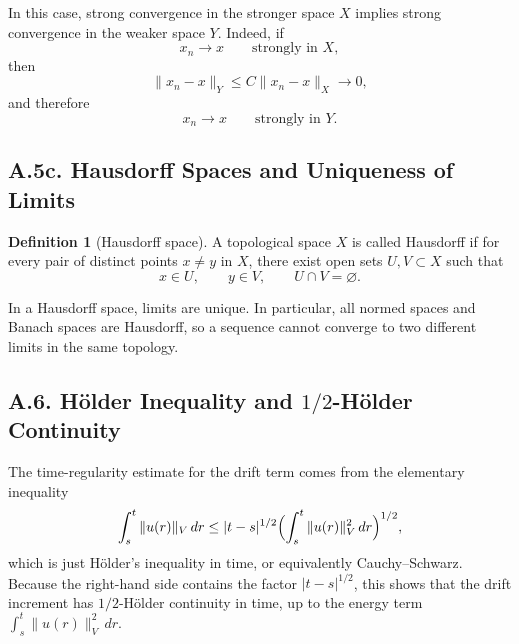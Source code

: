 \documentclass[11pt]{article}
\theoremstyle{definition}
\newtheorem{definition}{Definition}
\theoremstyle{remark}
\begin{document}
In this case, strong convergence in the stronger space $X$ implies strong convergence in the weaker space $Y$. Indeed, if
\[
  x_n\to x
  \qquad \text{strongly in } X,
\]
then
\[
  \|x_n-x\|_Y
  \le
  C\|x_n-x\|_X\to 0,
\]
and therefore
\[
  x_n\to x
  \qquad \text{strongly in } Y.
\]

\subsection*{A.5c. Hausdorff Spaces and Uniqueness of Limits}
\begin{definition}[Hausdorff space]
A topological space $X$ is called Hausdorff if for every pair of distinct points $x\neq y$ in $X$, there exist open sets $U,V\subset X$ such that
\[
  x\in U,\qquad y\in V,\qquad U\cap V=\varnothing.
\]
\end{definition}

In a Hausdorff space, limits are unique. In particular, all normed spaces and Banach spaces are Hausdorff, so a sequence cannot converge to two different limits in the same topology.

\subsection*{A.6. H\"older Inequality and $1/2$-H\"older Continuity}
The time-regularity estimate for the drift term comes from the elementary inequality
\[
  \int_s^t \|u(r)\|_V\,dr
  \le
  |t-s|^{1/2}
  \Bigl(\int_s^t \|u(r)\|_V^2\,dr\Bigr)^{1/2},
\]
which is just H\"older's inequality in time, or equivalently Cauchy--Schwarz. Because the right-hand side contains the factor $|t-s|^{1/2}$, this shows that the drift increment has $1/2$-H\"older continuity in time, up to the energy term $\int_s^t \|u(r)\|_V^2\,dr$.
\end{document}
